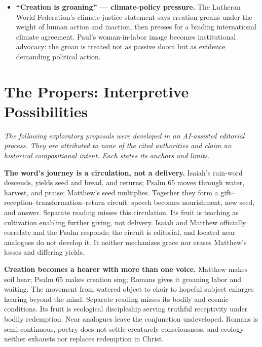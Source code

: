\begin{deepstudy}
{\begin{itemize}[itemsep=0em,topsep=0.15em,parsep=0pt]
\item \textbf{“Creation is groaning” --- climate-policy pressure.\enspace{}} The Lutheran World Federation's climate-justice statement says creation groans under the weight of human action and inaction, then presses for a binding international climate agreement. Paul's woman-in-labor image becomes institutional advocacy: the groan is treated not as passive doom but as evidence demanding political action.
\end{itemize}
}

\section*{The Propers: Interpretive Possibilities}

\noindent\emph{The following exploratory proposals were developed in an AI-assisted editorial process. They are attributed to none of the cited authorities and claim no historical compositional intent. Each states its anchors and limits.}

\noindent\textbf{The word's journey is a circulation, not a delivery.\enspace{}}
Isaiah's rain-word descends, yields seed and bread, and returns; Psalm 65 moves through water, harvest, and praise; Matthew's seed multiplies. Together they form a gift--reception--transformation--return circuit: speech becomes nourishment, new seed, and answer. Separate reading misses this circulation. Its fruit is teaching as cultivation enabling further giving, not delivery. Isaiah and Matthew officially correlate and the Psalm responds; the circuit is editorial, and located near analogues do not develop it. It neither mechanizes grace nor erases Matthew's losses and differing yields.

\noindent\textbf{Creation becomes a hearer with more than one voice.\enspace{}}
Matthew makes soil hear; Psalm 65 makes creation sing; Romans gives it groaning labor and waiting. The movement from watered object to choir to hopeful subject enlarges hearing beyond the mind. Separate reading misses its bodily and cosmic conditions. Its fruit is ecological discipleship serving truthful receptivity under bodily redemption. Near analogues leave the conjunction undeveloped. Romans is semi-continuous, poetry does not settle creaturely consciousness, and ecology neither exhausts nor replaces redemption in Christ.


\end{deepstudy}
